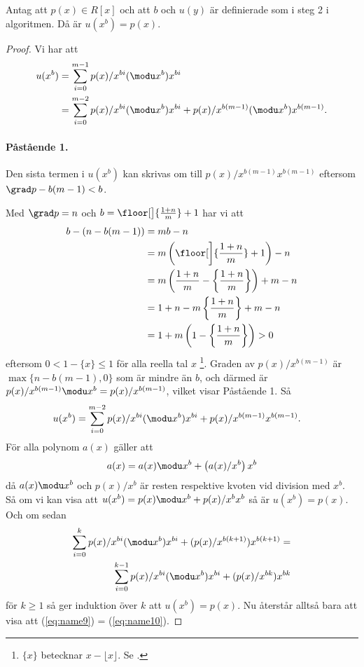 \begin{lemma}
  \label{lemma:2}
  Antag att $p(x) \in R[x]$ och att $b$ och $u(y)$ är definierade som i steg 2
  i algoritmen. Då är $u(x^b)=p(x)$.
\end{lemma}
\begin{proof}
  Vi har att
  \begin{align*}
    u(x^b) &= \sum_{i = 0}^{m-1} p(x)/x^{bi} (\modu x^b) x^{bi} \\
           &= \sum_{i = 0}^{m-2} p(x)/x^{bi} (\modu x^b) x^{bi} + p(x)/x^{b(m-1)} (\modu x^b) x^{b (m-1)}.
  \end{align*}
  \paragraph{Påstående 1.} Den sista termen i $u(x^b)$ kan skrivas om till
  $p(x)/x^{b (m-1)} x^{b (m-1)}$ eftersom $\grad p - b (m-1) < b$.

  Med $\grad p = n$ och $b = \floor[\big]{\frac{1 + n}{m}} + 1$ har vi att
  \begin{align*}
    b - (n - b(m-1)) &= m b - n \\
                     &= m \left( \floor[\bigg]{\frac{1 + n}{m}} + 1 \right) - n \\
                     &= m \left( \frac{1 + n}{m} - \left\{ \frac{1 + n}{m} \right\} \right) + m - n \\
                     &= 1 + n - m \left\{ \frac{1 + n}{m} \right\} + m - n \\
                     &= 1 + m \left( 1 - \left\{ \frac{1 + n}{m} \right\} \right) > 0
  \end{align*}
  eftersom $0 < 1 - \{ x \} \leq 1$ för alla reella tal $x$
  \footnote{$\{x\}$ betecknar $x-\lfloor x \rfloor$. Se \cite{graham1989concrete}.}.
  Graden av $p(x)/x^{b(m-1)}$ är $\max \{n - b(m-1),0\}$ som är mindre än $b$,
  och därmed är $p(x)/x^{b(m-1)}  \modu x^b = p(x)/x^{b(m-1)}$, vilket visar
  Påstående 1. Så
  \begin{align*}
    u(x^b) &= \sum_{i = 0}^{m-2} p(x)/x^{bi} (\modu x^b) x^{bi} + p(x)/x^{b(m-1)} x^{b(m-1)}.
  \end{align*}
  För alla polynom $a(x)$ gäller att
  \begin{align}
    a(x) = a(x) \modu x^b + \left(a(x)/x^b\right) x^b \label{eq:name8}
  \end{align}
  då $a(x) \modu x^b$ och $p(x)/x^{b}$ är resten respektive kvoten vid division
  med $x^b$. Så om vi kan visa att $u(x^b) = p(x) \modu x^b + p(x)/x^{b} x^{b}$
  så är $u(x^b) = p(x)$. Och om sedan
  \begin{align}
    \sum_{i = 0}^{k} p(x)/x^{bi}  (\modu x^b) x^{bi} + (p(x)/x^{b(k + 1)})  x^{b(k + 1)} = \label{eq:name9} \\
    \sum_{i = 0}^{k-1} p(x)/x^{bi}  (\modu x^b) x^{bi} + (p(x)/x^{b k})  x^{b k} \label{eq:name10}
  \end{align}
  för $k \geq 1$ så ger induktion över $k$ att $u(x^b) =  p(x)$. Nu återstår
  alltså bara att visa att (\ref{eq:name9}) = (\ref{eq:name10}).


\end{proof}
